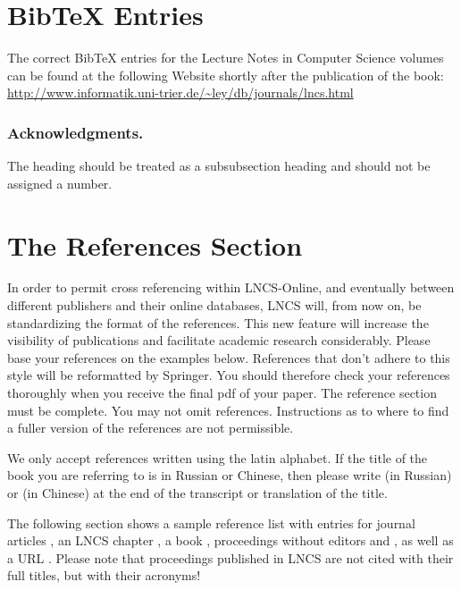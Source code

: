 \documentclass[runningheads,a4paper]{llncs}
\begin{document}
\section{BibTeX Entries}

The correct BibTeX entries for the Lecture Notes in Computer Science
volumes can be found at the following Website shortly after the
publication of the book:
\url{http://www.informatik.uni-trier.de/~ley/db/journals/lncs.html}

\subsubsection*{Acknowledgments.} The heading should be treated as a
subsubsection heading and should not be assigned a number.

\section{The References Section}\label{references}

In order to permit cross referencing within LNCS-Online, and eventually
between different publishers and their online databases, LNCS will,
from now on, be standardizing the format of the references. This new
feature will increase the visibility of publications and facilitate
academic research considerably. Please base your references on the
examples below. References that don't adhere to this style will be
reformatted by Springer. You should therefore check your references
thoroughly when you receive the final pdf of your paper.
The reference section must be complete. You may not omit references.
Instructions as to where to find a fuller version of the references are
not permissible.

We only accept references written using the latin alphabet. If the title
of the book you are referring to is in Russian or Chinese, then please write
(in Russian) or (in Chinese) at the end of the transcript or translation
of the title.

The following section shows a sample reference list with entries for
journal articles \cite{jour}, an LNCS chapter \cite{lncschap}, a book
\cite{book}, proceedings without editors \cite{proceeding1} and
\cite{proceeding2}, as well as a URL \cite{url}.
Please note that proceedings published in LNCS are not cited with their
full titles, but with their acronyms!
\end{document}
